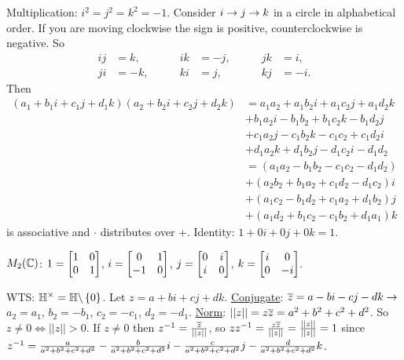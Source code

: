 \documentclass[]{article}
\begin{document}
Multiplication: $i^2=j^2=k^2 = -1$. Consider $i \rightarrow j \rightarrow k$ in a circle in alphabetical order. If you are moving clockwise the sign is positive, counterclockwise is negative.
So
\begin{align*}
	ij &= k, &\qquad ik &=-j, &\qquad jk &= i, \\
	ji &=-k, &\qquad ki &= j, &\qquad kj &=-i.
\end{align*}
Then
\begin{align*}
	(a_1+b_1i+c_1j+d_1k)(a_2+b_2i+c_2j+d_2k)
	&= a_1a_2+a_1b_2i+a_1c_2j+a_1d_2k \\
	&+ b_1a_2i-b_1b_2+b_1c_2k-b_1d_2j \\
	&+ c_1a_2j-c_1b_2k-c_1c_2+c_1d_2i \\
	&+ d_1a_2k+d_1b_2j-d_1c_2i-d_1d_2 \\
	&= (a_1a_2-b_1b_2-c_1c_2-d_1d_2) \\
	&+ (a_2b_2+b_1a_2+c_1d_2-d_1c_2)i \\
	&+ (a_1c_2-b_1d_2+c_1a_2+d_1b_2)j \\
	&+ (a_1d_2+b_1c_2-c_1b_2+d_1a_1)k
\end{align*}
is associative and $\cdot$ distributes over +.
Identity: $1+0i+0j+0k = 1$.

$M_2(\mathbb{C})$: $1 = \begin{bmatrix}1&0\\0&1\end{bmatrix}$, $i = \begin{bmatrix}0&1\\-1&0\end{bmatrix}$, $j = \begin{bmatrix}0&i\\i&0\end{bmatrix}$, $k = \begin{bmatrix}i&0\\0&-i\end{bmatrix}$.

WTS: $\mathbb{H}^\times = \mathbb{H}\backslash\left\{ 0 \right\}$.
Let $z = a+bi+cj+dk$.
\ul{Conjugate}: $\overline{z} = a-bi-cj-dk \rightarrow$ $a_2=a_1$, $b_2=-b_1$, $c_2=-c_1$, $d_2=-d_1$.
\ul{Norm}: $||z|| = z\overline{z} = a^2+b^2+c^2+d^2$.
So $z\neq0\iff ||z||>0$.
If $z\neq0$ then $z^{-1}=\frac{\overline{z}}{||z||}$, so $zz^{-1} = \frac{z\overline{z}}{||z||} = \frac{||z||}{||z||} = 1$ since $z^{-1} = \frac{a}{a^2+b^2+c^2+d^2} - \frac{b}{a^2+b^2+c^2+d^2}i - \frac{c}{a^2+b^2+c^2+d^2}j - \frac{d}{a^2+b^2+c^2+d^2}k$.
\end{document}
